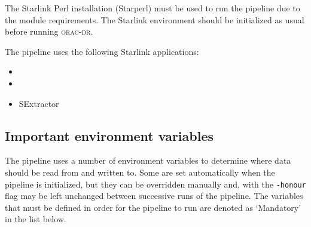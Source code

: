 \documentclass[twoside,11pt]{article}
\newcommand{\xref}[3]{#1}
\renewcommand{\_}{\texttt{\symbol{95}}}
\newcommand{\CCDPACK}{\xref{{\sc{Ccdpack}}}{sun139}{}}
\newcommand{\FIGARO}{\xref{{\sc{Figaro}}}{sun86}{}}
\newcommand{\KAPPA}{\xref{{\sc{Kappa}}}{sun95}{}}
\newcommand{\SEx}{{\sc SExtractor}}
\newcommand{\oracdr}{\textsc{orac-dr}}
\begin{document}
The Starlink Perl installation (Starperl) must be used to run the
pipeline due to the module requirements. The Starlink environment should be
initialized as usual before running \oracdr.

The pipeline uses the following Starlink applications:
\begin{itemize}
\item \KAPPA
\item \CCDPACK
\item \SEx
\end{itemize}

\subsection{Important environment variables}

The pipeline uses a number of environment variables to determine where
data should be read from and written to. Some are set automatically
when the pipeline is initialized, but they can be overridden manually
and, with the \verb+-honour+ flag may be left unchanged between
successive runs of the pipeline. The variables that must be defined in
order for the pipeline to run are denoted as `Mandatory' in the list
below.
\end{document}
